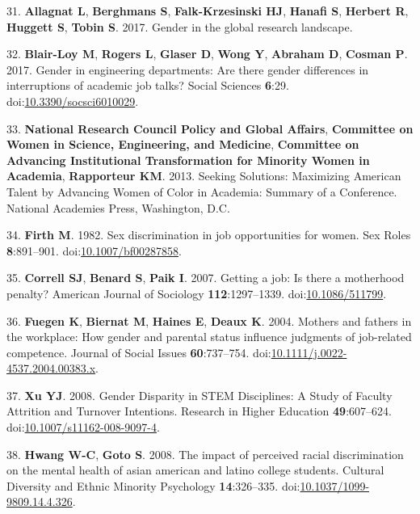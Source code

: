 \documentclass[10pt,]{article}
\begin{document}
\hypertarget{ref-allagnat_gender_2017}{}
31. \textbf{Allagnat L}, \textbf{Berghmans S}, \textbf{Falk-Krzesinski
HJ}, \textbf{Hanafi S}, \textbf{Herbert R}, \textbf{Huggett S},
\textbf{Tobin S}. 2017. Gender in the global research landscape.

\hypertarget{ref-BlairLoy2017}{}
32. \textbf{Blair-Loy M}, \textbf{Rogers L}, \textbf{Glaser D},
\textbf{Wong Y}, \textbf{Abraham D}, \textbf{Cosman P}. 2017. Gender in
engineering departments: Are there gender differences in interruptions
of academic job talks? Social Sciences \textbf{6}:29.
doi:\href{https://doi.org/10.3390/socsci6010029}{10.3390/socsci6010029}.

\hypertarget{ref-noauthor_seeking_2013}{}
33. \textbf{National Research Council \textnormal{Policy and Global
Affairs}}, \textbf{Committee on Women in Science, Engineering, and
Medicine}, \textbf{Committee on Advancing Institutional Transformation
for Minority Women in Academia}, \textbf{Rapporteur KM}. 2013. Seeking
Solutions: Maximizing American Talent by Advancing Women of Color in
Academia: Summary of a Conference. National Academies Press, Washington,
D.C.

\hypertarget{ref-Firth1982}{}
34. \textbf{Firth M}. 1982. Sex discrimination in job opportunities for
women. Sex Roles \textbf{8}:891--901.
doi:\href{https://doi.org/10.1007/bf00287858}{10.1007/bf00287858}.

\hypertarget{ref-Correll2007}{}
35. \textbf{Correll SJ}, \textbf{Benard S}, \textbf{Paik I}. 2007.
Getting a job: Is there a motherhood penalty? American Journal of
Sociology \textbf{112}:1297--1339.
doi:\href{https://doi.org/10.1086/511799}{10.1086/511799}.

\hypertarget{ref-Fuegen2004}{}
36. \textbf{Fuegen K}, \textbf{Biernat M}, \textbf{Haines E},
\textbf{Deaux K}. 2004. Mothers and fathers in the workplace: How gender
and parental status influence judgments of job-related competence.
Journal of Social Issues \textbf{60}:737--754.
doi:\href{https://doi.org/10.1111/j.0022-4537.2004.00383.x}{10.1111/j.0022-4537.2004.00383.x}.

\hypertarget{ref-xu_gender_2008}{}
37. \textbf{Xu YJ}. 2008. Gender Disparity in STEM Disciplines: A Study
of Faculty Attrition and Turnover Intentions. Research in Higher
Education \textbf{49}:607--624.
doi:\href{https://doi.org/10.1007/s11162-008-9097-4}{10.1007/s11162-008-9097-4}.

\hypertarget{ref-Hwang2008}{}
38. \textbf{Hwang W-C}, \textbf{Goto S}. 2008. The impact of perceived
racial discrimination on the mental health of asian american and latino
college students. Cultural Diversity and Ethnic Minority Psychology
\textbf{14}:326--335.
doi:\href{https://doi.org/10.1037/1099-9809.14.4.326}{10.1037/1099-9809.14.4.326}.
\end{document}
